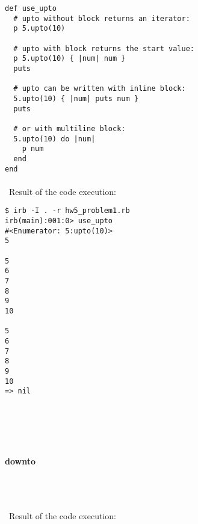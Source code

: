 \documentclass{article}
\begin{document}
\begin{verbatim}
def use_upto
  # upto without block returns an iterator:
  p 5.upto(10)

  # upto with block returns the start value:
  p 5.upto(10) { |num| num }
  puts

  # upto can be written with inline block:
  5.upto(10) { |num| puts num }
  puts

  # or with multiline block:
  5.upto(10) do |num|
    p num
  end
end
\end{verbatim}

\paragraph{}\
Result of the code execution:

\begin{verbatim} 
$ irb -I . -r hw5_problem1.rb
irb(main):001:0> use_upto
#<Enumerator: 5:upto(10)>
5

5
6
7
8
9
10

5
6
7
8
9
10
=> nil
\end{verbatim}

\paragraph{}\
\paragraph{}\


\paragraph{ downto}\

\begin{verbatim}

\end{verbatim}


\paragraph{}\
Result of the code execution:

\begin{verbatim} 

\end{verbatim}

\paragraph{}\
\end{document}
